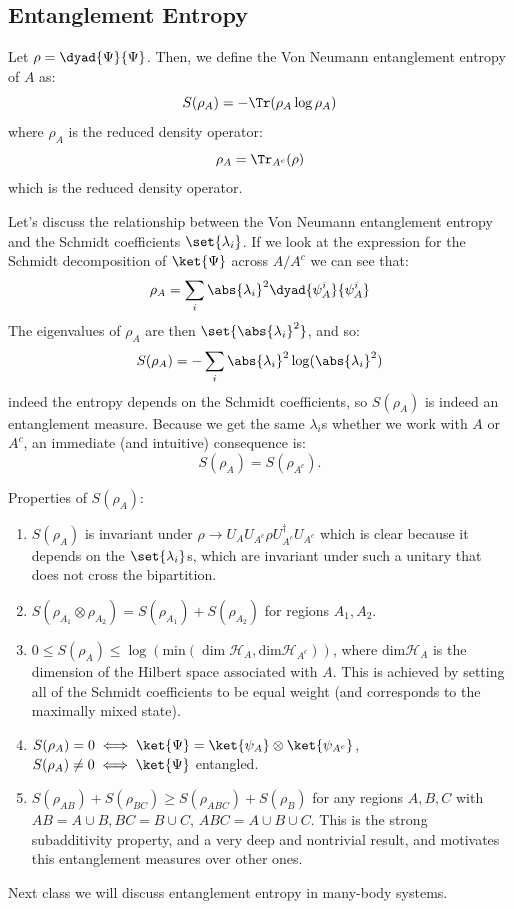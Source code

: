 \subsection{Entanglement Entropy}
Let $\rho = \dyad{\Psi}{\Psi}$. Then, we define the Von Neumann entanglement entropy of $A$ as:
\begin{equation}
    S(\rho_A) = -\Tr(\rho_A\log \rho_A)
\end{equation}
where $\rho_A$ is the reduced density operator:
\begin{equation}
    \rho_A = \Tr_{A^c}(\rho)
\end{equation}
which is the reduced density operator.

Let's discuss the relationship between the Von Neumann entanglement entropy and the Schmidt coefficients $\set{\lambda_i}$. If we look at the expression for the Schmidt decomposition of $\ket{\Psi}$ across $A/A^c$ we can see that:
\begin{equation}
    \rho_A = \sum_i \abs{\lambda_i}^2\dyad{\psi^i_A}{\psi^i_A}
\end{equation}
The eigenvalues of $\rho_A$ are then $\set{\abs{\lambda_i}^2}$, and so:
\begin{equation}
    S(\rho_A) = -\sum_i \abs{\lambda_i}^2\log(\abs{\lambda_i}^2)
\end{equation}
indeed the entropy depends on the Schmidt coefficients, so $S(\rho_A)$ is indeed an entanglement measure. Because we get the same $\lambda_i$s whether we work with $A$ or $A^c$, an immediate (and intuitive) consequence is:
\begin{equation}
    S(\rho_A) = S(\rho_{A^c}).
\end{equation}

Properties of $S(\rho_A)$:
\begin{enumerate}
    \item $S(\rho_A)$ is invariant under $\rho \to U_A U_{A^c} \rho U^\dag_{A^c}U_{A^c}$ which is clear because it depends on the $\set{\lambda_i}$s, which are invariant under such a unitary that does not cross the bipartition.
    \item $S(\rho_{A_1} \otimes \rho_{A_2}) = S(\rho_{A_1}) + S(\rho_{A_2})$ for regions $A_1, A_2$.
    \item $0 \leq S(\rho_A) \leq \log(\text{min}(\dim \mathcal{H}_A, \text{dim} \mathcal{H}_{A^c}))$, where $\text{dim} \mathcal{H}_A$ is the dimension of the Hilbert space associated with $A$. This is achieved by setting all of the Schmidt coefficients to be equal weight (and corresponds to the maximally mixed state).
    \item $S(\rho_A) = 0 \iff \ket{\Psi} = \ket{\psi_A} \otimes \ket{\psi_{A^c}}$, $S(\rho_A) \neq 0 \iff \ket{\Psi}$ entangled.
    \item $S(\rho_{AB}) + S(\rho_{BC}) \geq S(\rho_{ABC}) + S(\rho_B)$ for any regions $A, B, C$ with $AB = A\cup B, BC = B \cup C$, $ABC = A \cup B \cup C$. This is the strong subadditivity property, and a very deep and nontrivial result, and motivates this entanglement measures over other ones.
\end{enumerate}

Next class we will discuss entanglement entropy in many-body systems.